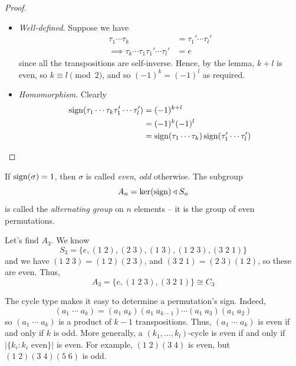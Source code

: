 \documentclass{../../template/note}
\begin{document}
    \begin{proof}
        \begin{itemize}
            \item \emph{Well-defined}. Suppose we have
            \begin{align*}
                \tau_1 \cdots \tau_k &= \tau_1' \cdots \tau_l' \\
                \implies \tau_k \cdots \tau_1 \tau_1' \cdots \tau_l' &= e
            \end{align*}
            since all the transpositions are self-inverse. Hence, by the lemma, \(k+l\) is even, so \(k \equiv l \pmod 2\), and so \((-1)^k = (-1)^l\) as required.
            \item \emph{Homomorphism}. Clearly
            \begin{align*}
                \operatorname{sign}(\tau_1 \cdots \tau_k \tau_1' \cdots \tau_l') &= (-1)^{k+l} \\
                &= (-1)^k(-1)^l \\
                &= \operatorname{sign}(\tau_1 \cdots \tau_k)\operatorname{sign}(\tau_1' \cdots \tau_l')
            \end{align*}
        \end{itemize}
    \end{proof}
    
    \begin{definition}
        If \(\operatorname{sign}(\sigma) = 1\), then \(\sigma\) is called \emph{even}, \emph{odd} otherwise. The subgroup
        \[
            A_n = \ker(\operatorname{sign}) \triangleleft S_n
        \]
        is called the \emph{alternating group} on \(n\) elements -- it is the group of even permutations.
    \end{definition}
    
    \begin{example}
        Let's find \(A_3\). We know
        \[
            S_3 = \{e, (1\; 2), (2 \; 3), (1 \; 3), (1 \; 2 \; 3), (3 \; 2 \; 1)\}
        \]
        and we have \((1 \; 2 \; 3) = (1 \; 2)(2 \; 3)\), and \((3 \; 2 \; 1) = (2 \; 3)(1 \; 2)\), so these are even. Thus,
        \[
            A_3 = \{e, (1 \; 2 \; 3), (3 \; 2 \; 1)\} \cong C_3
        \]
    \end{example}
    
    \begin{remark*}
        The cycle type makes it easy to determine a permutation's sign. Indeed,
        \[
            (a_1\; \cdots \; a_k) = (a_1 \; a_k) (a_1 \; a_{k-1}) \cdots (a_1 \; a_3)(a_1 \; a_2)
        \]
        so \((a_1 \; \cdots \; a_k)\) is a product of \(k-1\) transpositions. Thus, \((a_1 \; \cdots \; a_k)\) is even if and only if \(k\) is odd. More generally, a \((k_1, \dots, k_l)\)-cycle is even if and only if \(|\{k_i : k_i \text{ even}\}|\) is even. For example, \((1 \; 2)(3 \; 4)\) is even, but \((1 \; 2)(3 \; 4)(5 \; 6)\) is odd.
    \end{remark*}
    
\end{document}
